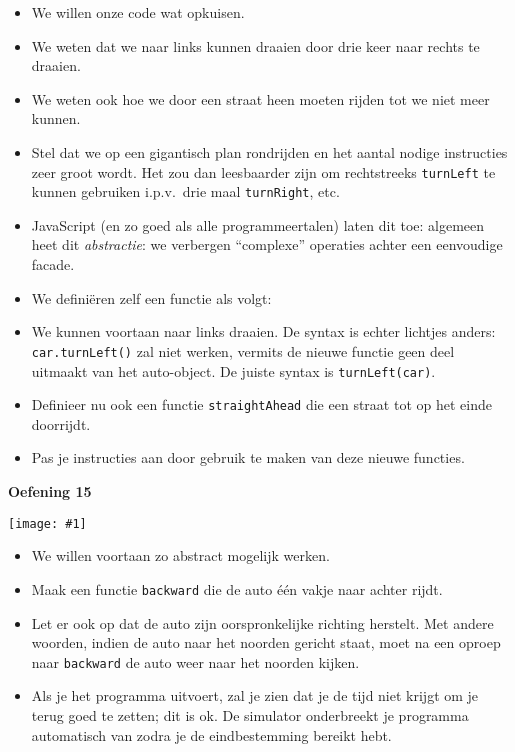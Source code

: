 \documentclass[a4paper]{article}
\newcommand{\newexercise}[1]{\clearpage\begin{center}\Huge\bf #1\end{center}}
\newcommand{\exercisemap}[1]{\begin{center}\texttt{[image: \#1]}\end{center}}
\newcommand{\code}[1]{
  \begin{center}
    \begin{minipage}{.8\linewidth}
      
    \end{minipage}
  \end{center}
}
\begin{document}
\begin{itemize}
  \item We willen onze code wat opkuisen.
  \item We weten dat we naar links kunnen draaien door drie keer naar rechts te draaien.
  \item We weten ook hoe we door een straat heen moeten rijden tot we niet meer kunnen.
  \item Stel dat we op een gigantisch plan rondrijden en het aantal nodige
        instructies zeer groot wordt. Het zou dan leesbaarder zijn om rechtstreeks
        \verb'turnLeft' te kunnen gebruiken i.p.v.\ drie maal \verb'turnRight', etc.
  \item JavaScript (en zo goed als alle programmeertalen) laten dit toe:
        algemeen heet dit \emph{abstractie}: we verbergen ``complexe'' operaties
        achter een eenvoudige facade.
  \item We defini\"eren zelf een functie als volgt:
        \code{turnleft.js}
  \item We kunnen voortaan naar links draaien. De syntax is echter lichtjes anders:
        \verb'car.turnLeft()' zal niet werken, vermits de nieuwe functie geen deel
        uitmaakt van het auto-object. De juiste syntax is \verb'turnLeft(car)'.
  \item Definieer nu ook een functie \verb'straightAhead' die een straat tot op het einde doorrijdt.
  \item Pas je instructies aan door gebruik te maken van deze nieuwe functies.
\end{itemize}


\newexercise{Oefening 15}
\exercisemap{ex15}
\begin{itemize}
  \item We willen voortaan zo abstract mogelijk werken.
  \item Maak een functie \verb'backward' die de auto \'e\'en vakje naar achter rijdt.
  \item Let er ook op dat de auto zijn oorspronkelijke richting herstelt. Met andere
        woorden, indien de auto naar het noorden gericht staat, moet na een
        oproep naar \verb'backward' de auto weer naar het noorden kijken.
  \item Als je het programma uitvoert, zal je zien dat je de tijd niet krijgt
        om je terug goed te zetten; dit is ok. De simulator onderbreekt je
        programma automatisch van zodra je de eindbestemming bereikt hebt.
\end{itemize}
\end{document}

